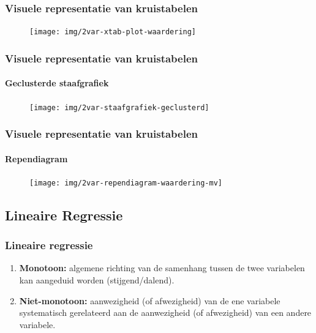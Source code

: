 \begin{frame}
	\frametitle{Visuele representatie van kruistabelen}
	
	\begin{figure}
		\centering
		\texttt{[image: img/2var-xtab-plot-waardering]}
	\end{figure}
	
\end{frame}

\begin{frame}
	\frametitle{Visuele representatie van kruistabelen}
	\framesubtitle{Geclusterde staafgrafiek}
	
	\begin{figure}
		\centering
		\texttt{[image: img/2var-staafgrafiek-geclusterd]}
	\end{figure}
	
\end{frame}

\begin{frame}
	\frametitle{Visuele representatie van kruistabelen}
	\framesubtitle{Rependiagram}
	
	\begin{figure}
		\centering
		\texttt{[image: img/2var-rependiagram-waardering-mv]}
	\end{figure}
	
\end{frame}

\subsection{Lineaire Regressie}


\begin{frame}
	\frametitle{Lineaire regressie}
	
	
	\begin{enumerate}
		\item \textbf{Monotoon:} algemene richting van de samenhang tussen de twee variabelen kan aangeduid worden (stijgend/dalend).
		\item \textbf{Niet-monotoon:}  aanwezigheid (of afwezigheid) van de ene variabele systematisch gerelateerd aan de aanwezigheid (of afwezigheid) van een andere variabele.
	\end{enumerate}
\end{frame}

